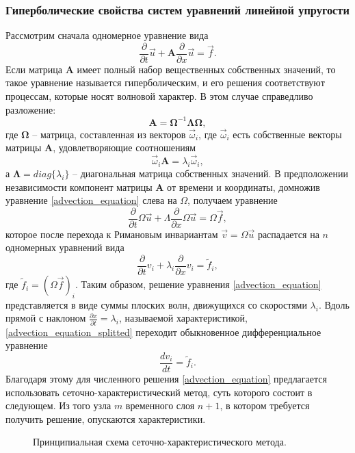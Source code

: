 \subsubsection{Гиперболические свойства систем уравнений линейной упругости}
Рассмотрим сначала одномерное уравнение вида
\begin{equation}
\frac{\partial}{\partial{t}}\vec{u}+\mathbf{A}\frac{\partial}{\partial{x}}\vec{u}=\vec{f}.
\label{advection_equation}
\end{equation}
Если матрица $\mathbf{A}$ имеет полный набор вещественных собственных значений, 
то такое уравнение называется гиперболическим, и его решения соответствуют 
процессам, которые носят волновой характер. В этом случае справедливо разложение:
$$\mathbf{A}=\mathbf\Omega^{-1}\mathbf\Lambda\mathbf\Omega,$$
где $\mathbf\Omega$ -- матрица, составленная из векторов ${\vec\omega_i}$, где
$\vec\omega_i$ есть собственные векторы матрицы $\mathbf A$,
удовлетворяющие соотношениям
$$\vec\omega_i\mathbf A=\lambda_i\vec\omega_i,$$
а $\mathbf\Lambda=diag\{\lambda_i\}$ -- диагональная матрица собственных
значений.
В предположении независимости компонент матрицы $\mathbf{A}$ от времени и координаты, домножив уравнение \ref{advection_equation} слева на $\Omega$, получаем
уравнение
$$\frac{\partial}{\partial t}\Omega{\vec u}+
\Lambda\frac{\partial}{\partial x}\Omega{\vec u}=\Omega{\vec f},$$
которое после перехода к Римановым инвариантам ${\vec v}=\Omega{\vec u}$
распадается на $n$ одномерных уравнений вида
\begin{equation}
\frac{\partial}{\partial t}{v_i}+\lambda_i\frac{\partial}{\partial
x}{v_i}={{\tilde f}_i},
\label{advection_equation_splitted}
\end{equation}
где ${{\tilde f}_i}=(\Omega{\vec f})_i$.
Таким образом, решение уравнения \ref{advection_equation} представляется в виде
суммы плоских волн, движущихся со скоростями $\lambda_i$. Вдоль прямой с наклоном 
$\frac{\partial x}{\partial t} = \lambda_i$, называемой характеристикой, \ref{advection_equation_splitted} переходит обыкновенное дифференциальное уравнение 
\begin{equation}
\frac{d{v_i}}{dt} = {{\tilde f}_i}.
\label{advection_equation_final} 
\end{equation}
Благодаря этому для численного решения \ref{advection_equation} предлагается использовать сеточно-характеристический метод, суть которого состоит в следующем. Из того узла $m$ временного слоя $n+1$, в котором требуется получить решение, опускаются характеристики.
\begin{figure}[h]
\caption{Принципиальная схема сеточно-характеристического метода.}
\end{figure}
